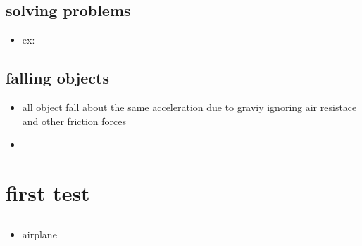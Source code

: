 \documentclass[10pt,a4paper]{report}
\begin{document}
\section{solving problems }
\begin{itemize}
\item ex$\colon $ 
\end{itemize}
\section{falling objects}
\begin{itemize}
\item all object fall about the same acceleration due to graviy ignoring air resistace and other friction forces 
\item 
\end{itemize}

\chapter{first test}
\section{}
\begin{itemize}
\item airplane 
\end{itemize}
\end{document}
